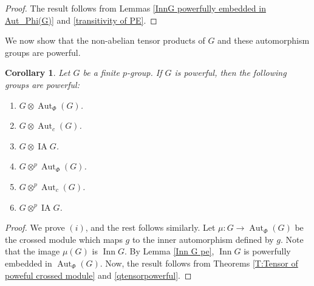 \documentclass[12pt]{elsarticle}
\newtheorem{corollary}[theorem]{Corollary}
\newtheorem*{main corollary*}{Main Corollary}
\theoremstyle{definition}
\newcommand{\ptens}{
	\otimes^p}
\begin{document}
\begin{proof}
The result follows from Lemmas \ref{InnG powerfully embedded in Aut_Phi(G)} and \ref{transitivity of PE}.
\end{proof}

We now show that the non-abelian tensor products of $G$ and these automorphism groups are powerful.
\begin{corollary} \label{Aut tensor powerful}
    Let $G$ be a finite $p$-group. If $G$ is powerful, then the following groups are powerful:
    \begin{enumerate}
        \item[(i)] $G \otimes \operatorname{Aut}_\Phi(G)$.
        \item[(ii)] $G \otimes \operatorname{Aut}_c(G)$.
        \item[(iii)] $G \otimes 
        \operatorname{IA} G$.
        \item[(iv)] $G \ptens \operatorname{Aut}_\Phi(G)$.
        \item[(v)] $G \ptens \operatorname{Aut}_c(G)$.
        \item[(vi)] $G \ptens 
        \operatorname{IA} G$.
    \end{enumerate}
    
\end{corollary}

\begin{proof}
    We prove $(i)$, and the rest follows similarly. Let $\mu: G \to \operatorname{Aut}_\Phi(G)$ be the crossed module which maps $g$ to the inner automorphism defined by $g$. Note that the image $\mu(G)$ is $\operatorname{Inn} G$. By Lemma \ref{Inn G pe}, $\operatorname{Inn} G$ is powerfully embedded in $\operatorname{Aut}_\Phi(G)$. Now, the result follows from Theorems \ref{T:Tensor of poweful crossed module} and \ref{qtensorpowerful}.
\end{proof}
\end{document}
